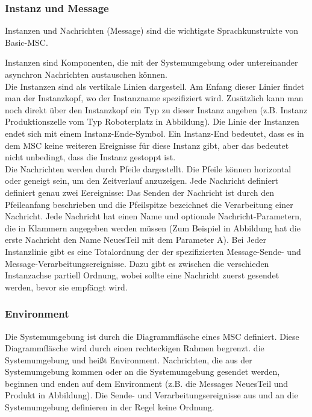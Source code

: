 \subsubsection{Instanz und Message}
Instanzen und Nachrichten (Message) sind die wichtigste Sprachkunstrukte von Basic-MSC.

Instanzen sind Komponenten, die mit der Systemumgebung oder untereinander
asynchron Nachrichten austauschen können.\\
Die Instanzen sind als vertikale Linien dargestell. Am Enfang dieser Linier findet man der Instanzkopf, wo der Instanzname spezifiziert wird. Zusätzlich kann man noch direkt über den Instanzkopf ein Typ zu dieser Instanz angeben (z.B. Instanz Produktionszelle vom Typ Roboterplatz in Abbildung).
Die Linie der Instanzen endet sich mit einem Instanz-Ende-Symbol. Ein Instanz-End bedeutet, dass es in dem MSC keine weiteren Ereignisse für diese Instanz gibt, aber das bedeutet nicht unbedingt, dass die Instanz gestoppt ist.\\


Die Nachrichten werden durch Pfeile dargestellt. Die Pfeile
können horizontal oder geneigt sein, um den Zeitverlauf
anzuzeigen. 
Jede Nachricht definiert definiert genau zwei Eereignisse: Das Senden der Nachricht ist durch den Pfeileanfang beschrieben und die Pfeilspitze bezeichnet
die Verarbeitung einer Nachricht.
Jede Nachricht hat einen Name und optionale Nachricht-Parametern, die in Klammern angegeben werden müssen (Zum Beispiel in Abbildung hat die erste Nachricht den Name NeuesTeil mit dem Parameter A).
 Bei Jeder Instanzlinie gibt es eine Totalordnung der der spezifizierten
 Message-Sende- und Message-Verarbeitungsereignisse. Dazu gibt es zwischen die verschieden Instanzachse partiell Ordnung, wobei sollte eine Nachricht zuerst gesendet werden, bevor sie empfängt wird. 

\subsubsection{Environment}
Die Systemumgebung ist durch die Diagrammfläsche eines MSC definiert. Diese Diagrammfläsche wird durch einen rechteckigen Rahmen begrenzt.
die Systemumgebung und heißt Environment. Nachrichten,
die aus der Systemumgebung kommen oder an die Systemumgebung
gesendet werden, beginnen und enden auf
dem Environment (z.B. die Messages NeuesTeil und
Produkt in Abbildung). Die Sende- und Verarbeitungsereignisse aus und an die Systemumgebung definieren in der Regel keine Ordnung.

